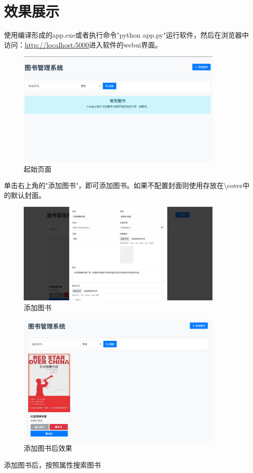 \documentclass{SYSUReport}
\begin{document}
\section{效果展示}
使用编译形成的app.exe或者执行命令"python app.py"运行软件，然后在浏览器中访问：\url{http://localhost:5000}进入软件的webui界面。

\begin{figure}[H]
    \centering
    \includegraphics[width=0.9\textwidth]{figures/start_menu.png}
    \caption{起始页面}
    \label{fig:flow}
\end{figure}

单击右上角的"添加图书"，即可添加图书。如果不配置封面则使用存放在\textbackslash cover中的默认封面。
\begin{figure}[H]
    \centering
    \includegraphics[width=0.9\textwidth]{figures/add_book.png}
    \caption{添加图书}
    \label{fig:flow}
\end{figure}

\begin{figure}[H]
    \centering
    \includegraphics[width=0.9\textwidth]{figures/add_cpt.png}
    \caption{添加图书后效果}
    \label{fig:flow}
\end{figure}
添加图书后，按照属性搜索图书
\end{document}
